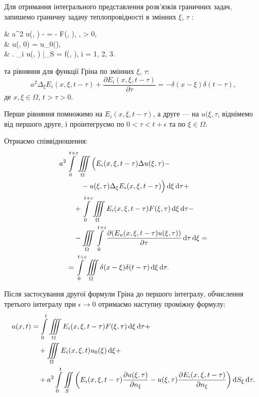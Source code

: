 Для отримання інтегрального представлення розв'язків граничних задач, запишемо граничну задачу теплопровідності в змінних $\xi$, $\tau$ :
\begin{system}
	& a^2 \Delta u(\xi, \tau) -  = - F(\xi, \tau), \quad \xi \in \Omega, \quad \tau > 0, \\
	& u(\xi, 0) = u_0(\xi), \\
	& \left. \ell_i u(\xi, \tau) \right|_{\xi \in S} = f(\xi, \tau), \quad i = 1, 2, 3. 
\end{system}
та рівняння для функції Гріна по змінних $\xi$, $\tau$:
\begin{equation}
	a^2 \Delta_\xi E_i(x, \xi, t - \tau) + \frac{\partial E_i(x, \xi, t - \tau)}{\partial \tau} = - \delta(x - \xi) \delta(t - \tau),
\end{equation}
де $x, \xi \in \Omega$, $ t > \tau > 0$. \medskip

Перше рівняння помножимо на $E_i(x, \xi, t - \tau)$, а друге --- на $u(\xi, \tau$, віднімемо від першого друге, і проінтегруємо по $0 < \tau < t + \epsilon$ та по $\xi \in \Omega$. \medskip

Отриаємо співвідношення:
\begin{equation}
	\begin{aligned}
		& a^2 \Int_0^{t + \epsilon} \Iiint_\Omega \Big( E_i(x, \xi, t - \tau) \Delta u(\xi, \tau) - \\
		& \qquad \quad - u(\xi, \tau) \Delta_\xi E_i(x, \xi, t - \tau) \Big) \diff \xi \diff \tau + \\
		& \qquad + \Int_0^{t + \epsilon} \Iiint_\Omega E_i(x, \xi, t - \tau) F(\xi, \tau) \diff \xi \diff \tau - \\
		& \qquad -  \Iiint_\Omega \Int_0^{t+\epsilon} \frac{\partial (E_u(x, \xi, t - \tau) u(\xi, \tau))}{\partial \tau} \diff \tau \diff \xi = \\
		& \quad =  \Int_0^{t + \epsilon} \Iiint_\Omega \delta(x - \xi) \delta(t - \tau) \diff \xi \diff \tau.
	\end{aligned}
\end{equation}

Після застосування другої формули Гріна до першого інтегралу, обчислення третього інтегралу при $\epsilon \to 0$ отримаємо наступну проміжну формулу:
\begin{equation}
	\begin{aligned}
		u(x, t) &= \displaystyle\int\limits_0^t \displaystyle\iiint\limits_\Omega E_i(x, \xi, t - \tau) F(\xi, \tau) \mathop{}\!\mathrm{d} \xi \mathop{}\!\mathrm{d} \tau + \\
		& \quad + \displaystyle\iiint\limits_\Omega E_i(x, \xi, t) u_0(\xi) \mathop{}\!\mathrm{d} \xi + \\
		& \quad + a^2 \displaystyle\int\limits_0^t \displaystyle\iint\limits_S \left( E_i(x, \xi, t - \tau) \frac{\partial u(\xi, \tau)}{\partial n_\xi} - u(\xi, \tau) \frac{\partial E_i(x, \xi, t - \tau)}{\partial n_\xi} \right) \mathop{}\!\mathrm{d} S_\xi \mathop{}\!\mathrm{d} \tau.
	\end{aligned}
\end{equation}

